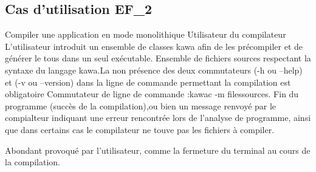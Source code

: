 \subsection{Cas d'utilisation EF\_2}
\fiche
{Compiler une application en mode monolithique}                    %
{Utilisateur du compilateur}                               %
{                                                %
  L'utilisateur introduit un ensemble de classes
  kawa afin de les précompiler et de générer le tous dans un seul exécutable.
}
{
	Ensemble de fichiers sources 
	respectant la syntaxe du langage kawa.La non présence des deux commutateurs (-h ou --help) et (-v ou --version) dans la ligne de commande permettant la compilation est obligatoire
}                                                %
{Commutateur de ligne de commande :kawac -m filessources.}                             %
{Fin du programme (succès de la compilation),ou bien un message renvoyé par le compialteur indiquant une erreur rencontrée lors de l'analyse de programme, ainsi que dans certains cas le compilateur ne touve pas les fichiers à compiler. 
}                       %
{                                                %
  
}
{} %
{Abondant provoqué par l'utilisateur, comme la fermeture du terminal au cours de la compilation. } %


